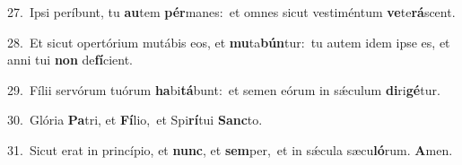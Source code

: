 {\numbfont\textcolor{\numbcolor}{27.}}~Ipsi períbunt, tu \textbf{au}\-tem \textbf{pér}\-manes:~\star et omnes sicut vestiméntum \textbf{ve}\-te\-\textbf{rá}\-scent.\par
{\numbfont\textcolor{\numbcolor}{28.}}~Et sicut opertórium mutábis eos, et \textbf{mu}\-ta\-\textbf{bún}\-tur:~\star tu autem idem ipse es, et anni tui \textbf{non} de\-\textbf{fí}\-cient.\par
{\numbfont\textcolor{\numbcolor}{29.}}~Fílii servórum tuórum \textbf{ha}\-bi\-\textbf{tá}\-bunt:~\star et semen eórum in sǽculum \textbf{di}\-ri\-\textbf{gé}\-tur.\par
{\numbfont\textcolor{\numbcolor}{30.}}~Glória \textbf{Pa}\-tri, et \textbf{Fí}\-lio,~\star et Spi\-\textbf{rí}\-tui \textbf{Sanc}\-to.\par
{\numbfont\textcolor{\numbcolor}{31.}}~Sicut erat in princípio, et \textbf{nunc}\-, et \textbf{sem}\-per,~\star et in sǽcula sæcu\-\textbf{ló}\-rum. \textbf{A}\-men.\par
